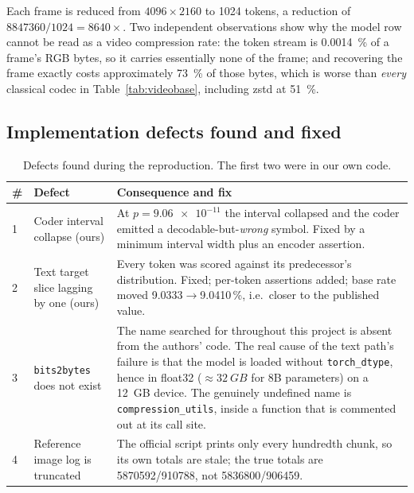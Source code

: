 \documentclass[11pt,a4paper]{article}
\newcommand{\code}[1]{\texttt{\small #1}}
\begin{document}
Each frame is reduced from $4096\times2160$ to \num{1024} tokens, a reduction of
$\num{8847360}/\num{1024} = \num{8640}\times$. Two independent observations show
why the model row cannot be read as a video compression rate: the token stream is
\SI{0.0014}{\%} of a frame's RGB bytes, so it carries essentially none of
the frame; and recovering the frame exactly costs approximately
\SI{73}{\%} of those bytes, which is worse than \emph{every} classical codec
in Table~\ref{tab:videobase}, including zstd at \SI{51}{\%}.

\subsection{Implementation defects found and fixed}

\begin{table}[htbp]
\centering
\small
\caption{Defects found during the reproduction. The first two were in our own
code.}
\label{tab:bugs}
\begin{tabularx}{\textwidth}{L{0.7cm}L{4.6cm}X}
\toprule
\# & Defect & Consequence and fix \\
 & Coder interval collapse (ours) & At $p=\num{9.06e-11}$ the interval collapsed
  and the coder emitted a decodable-but-\emph{wrong} symbol. Fixed by a minimum
  interval width plus an encoder assertion. \\
2 & Text target slice lagging by one (ours) & Every token was scored against its
  predecessor's distribution. Fixed; per-token assertions added; base rate moved
  \num{9.0333}$\to$\num{9.0410}\,\%, i.e.\ closer to the published value. \\
3 & \code{bits2bytes} does not exist & The name searched for throughout this
  project is absent from the authors' code. The real cause of the text path's
  failure is that the model is loaded without \code{torch\_dtype}, hence in
  float32 ($\approx\SI{32}{GB}$ for 8B parameters) on a \SI{12}{GB} device.
  The genuinely undefined name is \code{compression\_utils}, inside a function
  that is commented out at its call site. \\
4 & Reference image log is truncated & The official script prints only every
  hundredth chunk, so its own totals are stale; the true totals are
  \num{5870592}/\num{910788}, not \num{5836800}/\num{906459}. \\
\bottomrule
\end{tabularx}
\end{table}

\end{document}
